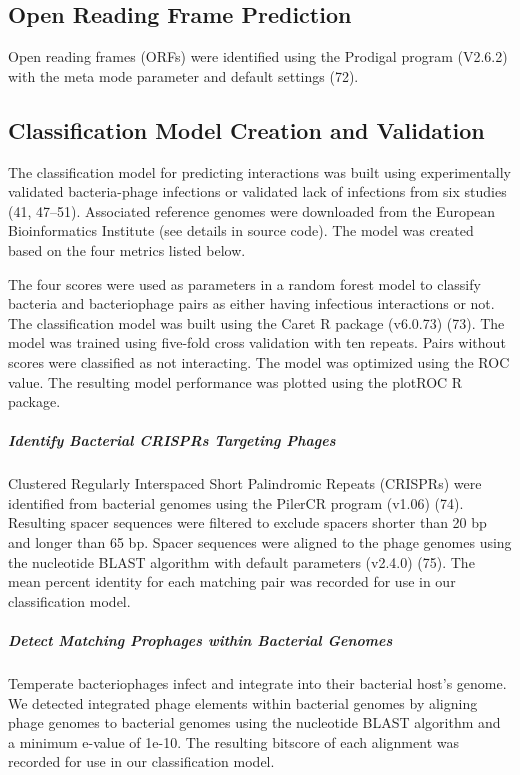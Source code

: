 \documentclass[12pt,]{article}
\let\oldsubparagraph\subparagraph
\renewcommand{\subparagraph}[1]{\oldsubparagraph{#1}\mbox{}}
\begin{document}
\subsection{Open Reading Frame
Prediction}\label{open-reading-frame-prediction}

Open reading frames (ORFs) were identified using the Prodigal program
(V2.6.2) with the meta mode parameter and default settings (72).

\subsection{Classification Model Creation and
Validation}\label{classification-model-creation-and-validation}

The classification model for predicting interactions was built using
experimentally validated bacteria-phage infections or validated lack of
infections from six studies (41, 47--51). Associated reference genomes
were downloaded from the European Bioinformatics Institute (see details
in source code). The model was created based on the four metrics listed
below.

The four scores were used as parameters in a random forest model to
classify bacteria and bacteriophage pairs as either having infectious
interactions or not. The classification model was built using the Caret
R package (v6.0.73) (73). The model was trained using five-fold cross
validation with ten repeats. Pairs without scores were classified as not
interacting. The model was optimized using the ROC value. The resulting
model performance was plotted using the plotROC R package.

\subparagraph{Identify Bacterial CRISPRs Targeting
Phages}\label{identify-bacterial-crisprs-targeting-phages}

Clustered Regularly Interspaced Short Palindromic Repeats (CRISPRs) were
identified from bacterial genomes using the PilerCR program (v1.06)
(74). Resulting spacer sequences were filtered to exclude spacers
shorter than 20 bp and longer than 65 bp. Spacer sequences were aligned
to the phage genomes using the nucleotide BLAST algorithm with default
parameters (v2.4.0) (75). The mean percent identity for each matching
pair was recorded for use in our classification model.

\subparagraph{Detect Matching Prophages within Bacterial
Genomes}\label{detect-matching-prophages-within-bacterial-genomes}

Temperate bacteriophages infect and integrate into their bacterial
host's genome. We detected integrated phage elements within bacterial
genomes by aligning phage genomes to bacterial genomes using the
nucleotide BLAST algorithm and a minimum e-value of 1e-10. The resulting
bitscore of each alignment was recorded for use in our classification
model.
\end{document}
